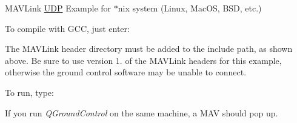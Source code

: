 M\+A\+V\+Link \mbox{\hyperlink{classUDP}{U\+DP}} Example for $\ast$nix system (Linux, Mac\+OS, B\+SD, etc.)

To compile with G\+CC, just enter\+:


\begin{DoxyCode}{0}
\end{DoxyCode}


The M\+A\+V\+Link header directory must be added to the include path, as shown above. Be sure to use version 1. of the M\+A\+V\+Link headers for this example, otherwise the ground control software may be unable to connect.

To run, type\+:


\begin{DoxyCode}{0}
\end{DoxyCode}


If you run {\itshape Q\+Ground\+Control} on the same machine, a M\+AV should pop up. 